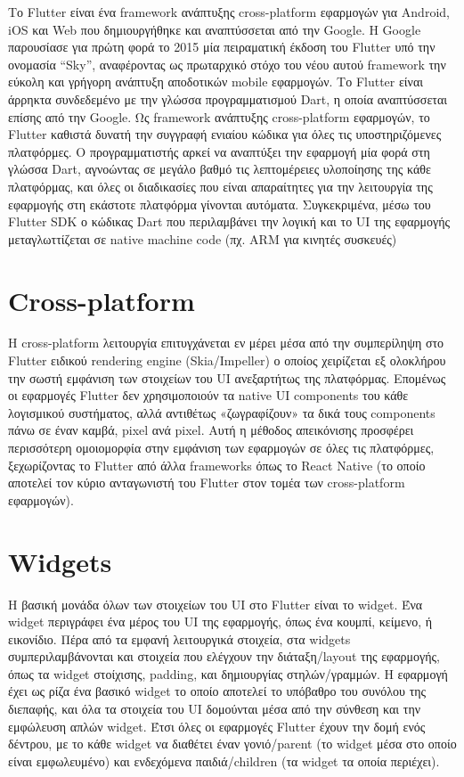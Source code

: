 \documentclass[../thesis.tex]{subfiles}
\begin{document}
Το Flutter είναι ένα framework ανάπτυξης cross-platform εφαρμογών για Android, iOS και Web που δημιουργήθηκε και αναπτύσσεται από την Google.
Η Google παρουσίασε για πρώτη φορά το 2015 μία πειραματική έκδοση του Flutter υπό την ονομασία “Sky”, αναφέροντας ως πρωταρχικό στόχο του νέου αυτού framework την εύκολη και γρήγορη ανάπτυξη αποδοτικών mobile εφαρμογών.
Το Flutter είναι άρρηκτα συνδεδεμένο με την γλώσσα προγραμματισμού Dart, η οποία αναπτύσσεται επίσης από την Google.
Ως framework ανάπτυξης cross-platform εφαρμογών, το Flutter καθιστά δυνατή την συγγραφή ενιαίου κώδικα για όλες τις υποστηριζόμενες πλατφόρμες.
Ο προγραμματιστής αρκεί να αναπτύξει την εφαρμογή μία φορά στη γλώσσα Dart,
αγνοώντας σε μεγάλο βαθμό τις λεπτομέρειες υλοποίησης της κάθε πλατφόρμας,
και όλες οι διαδικασίες που είναι απαραίτητες για την λειτουργία της εφαρμογής στη εκάστοτε πλατφόρμα γίνονται αυτόματα.
Συγκεκριμένα, μέσω του Flutter SDK ο κώδικας Dart που περιλαμβάνει την λογική και το UI της εφαρμογής μεταγλωττίζεται σε native machine code (πχ. ARM για κινητές συσκευές)

\section{Cross-platform}
Η cross-platform λειτουργία επιτυγχάνεται εν μέρει μέσα από την συμπερίληψη στο Flutter ειδικού rendering engine (Skia/Impeller) ο οποίος χειρίζεται εξ ολοκλήρου την σωστή εμφάνιση των στοιχείων του UI ανεξαρτήτως της πλατφόρμας.
Επομένως οι εφαρμογές Flutter δεν χρησιμοποιούν τα native UI components του κάθε λογισμικού συστήματος, αλλά αντιθέτως «ζωγραφίζουν» τα δικά τους components πάνω σε έναν καμβά, pixel ανά pixel.
Αυτή η μέθοδος απεικόνισης προσφέρει περισσότερη ομοιομορφία στην εμφάνιση των εφαρμογών σε όλες τις πλατφόρμες, ξεχωρίζοντας το Flutter από άλλα frameworks όπως το React Native (το οποίο αποτελεί τον κύριο ανταγωνιστή του Flutter στον τομέα των cross-platform εφαρμογών).

\section{Widgets}
Η βασική μονάδα όλων των στοιχείων του UI στο Flutter είναι το widget.
Ένα widget περιγράφει ένα μέρος του UI της εφαρμογής, όπως ένα κουμπί, κείμενο, ή εικονίδιο.
Πέρα από τα εμφανή λειτουργικά στοιχεία, στα widgets συμπεριλαμβάνονται και στοιχεία που ελέγχουν την διάταξη/layout της εφαρμογής, όπως τα widget στοίχισης, padding, και δημιουργίας στηλών/γραμμών.
Η εφαρμογή έχει ως ρίζα ένα βασικό widget το οποίο αποτελεί το υπόβαθρο του συνόλου της διεπαφής, και όλα τα στοιχεία του UI δομούνται μέσα από την σύνθεση και την εμφώλευση απλών widget.
Έτσι όλες οι εφαρμογές Flutter έχουν την δομή ενός δέντρου, με το κάθε widget να διαθέτει έναν γονιό/parent (το widget μέσα στο οποίο είναι εμφωλευμένο) και ενδεχόμενα παιδιά/children (τα widget τα οποία περιέχει).
\end{document}
